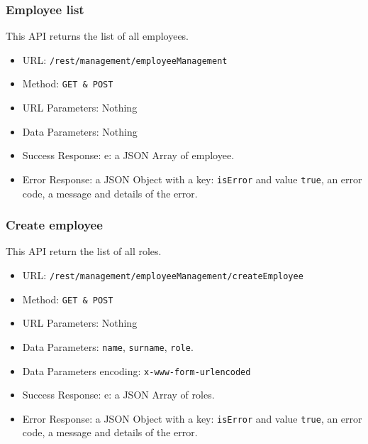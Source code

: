 \subsubsection*{Employee list}
This API returns the list of all employees. 

\begin{itemize}
    \item URL: \texttt{/rest/management/employeeManagement}
    \item Method: \texttt{{GET \& POST}}
    \item URL Parameters: Nothing
    \item Data Parameters: Nothing
    \item Success Response: e: a JSON Array of employee.
    \item Error Response: a JSON Object with a key: \texttt{isError}  and value \texttt{true}, an error code, a message and details of the error.
\end{itemize}

\subsubsection*{Create employee}
This API return the list of all roles.

\begin{itemize}
    \item URL: \texttt{/rest/management/employeeManagement/createEmployee}
    \item Method: \texttt{{GET \& POST}}
    \item URL Parameters: Nothing
    \item Data Parameters: \texttt{name}, \texttt{surname}, \texttt{role}.
    \item Data Parameters encoding: \texttt{x-www-form-urlencoded}
    \item Success Response: e: a JSON Array of roles.
    \item Error Response: a JSON Object with a key: \texttt{isError}  and value \texttt{true}, an error code, a message and details of the error.
\end{itemize}

